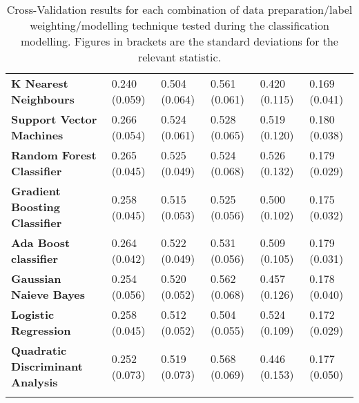 {\begin{longtable}[c]{P{30mm} P{17mm} P{17mm} P{17mm} P{17mm} P{17mm} }
        \textbf{K Nearest Neighbours}            & 0.240 (0.059) & 0.504 (0.064) & 0.561 (0.061) & 0.420 (0.115) & 0.169 (0.041) \\*
        \textbf{Support Vector Machines}         & 0.266 (0.054) & 0.524 (0.061) & 0.528 (0.065) & 0.519 (0.120) & 0.180 (0.038) \\*
        \textbf{Random Forest Classifier}        & 0.265 (0.045) & 0.525 (0.049) & 0.524 (0.068) & 0.526 (0.132) & 0.179 (0.029) \\*
        \textbf{Gradient Boosting Classifier}    & 0.258 (0.045) & 0.515 (0.053) & 0.525 (0.056) & 0.500 (0.102) & 0.175 (0.032) \\*
        \textbf{Ada Boost classifier}            & 0.264 (0.042) & 0.522 (0.049) & 0.531 (0.056) & 0.509 (0.105) & 0.179 (0.031) \\*
        \textbf{Gaussian Naieve Bayes}           & 0.254 (0.056) & 0.520 (0.052) & 0.562 (0.068) & 0.457 (0.126) & 0.178 (0.040) \\*
        \textbf{Logistic Regression}             & 0.258 (0.045) & 0.512 (0.052) & 0.504 (0.055) & 0.524 (0.109) & 0.172 (0.029) \\*
        \textbf{Quadratic Discriminant Analysis} & 0.252 (0.073) & 0.519 (0.073) & 0.568 (0.069) & 0.446 (0.153) & 0.177 (0.050) \\\toprule
        \caption[Cross-validation results for combinations of classification modelling techniques]{Cross-Validation results for each combination of data preparation/label weighting/modelling technique tested during the classification modelling. Figures in brackets are the standard deviations for the relevant statistic.}
        \label{tab:cv-results}
\end{longtable}
}

\clearpage
